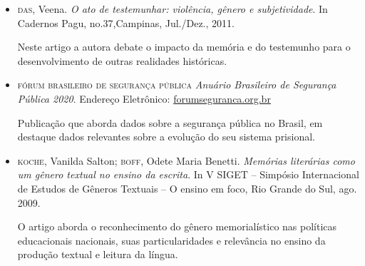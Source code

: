 \documentclass[11pt]{extarticle}
\begin{document}
\begin{itemize}



\item\textsc{das}, Veena. \textit{O ato de testemunhar: violência, gênero e subjetividade}. In
Cadernos Pagu, no.37,Campinas, Jul./Dez., 2011. 

Neste artigo a autora debate o impacto da memória e do testemunho para o desenvolvimento 
de outras realidades históricas.

\item\textsc{fórum brasileiro de
segurança pública} \textit{Anuário Brasileiro de Segurança Pública 2020}. Endereço Eletrônico:
\href{https://forumseguranca.org.br/wp-content/uploads/2020/10/anuario-14-2020-v1-interativo.pdf}{forumseguranca.org.br} 

Publicação que aborda dados sobre a segurança pública no Brasil, em
destaque dados relevantes sobre a evolução do seu sistema prisional.




\item\textsc{koche}, Vanilda Salton; \textsc{boff}, Odete Maria Benetti. \textit{Memórias literárias
como um gênero textual no ensino da escrita}. In V SIGET -- Simpósio
Internacional de Estudos de Gêneros Textuais -- O ensino em foco, Rio
Grande do Sul, ago. 2009. 

O artigo aborda o reconhecimento do gênero memorialístico nas políticas educacionais 
nacionais, suas particularidades e relevância no ensino da produção textual e leitura 
da língua.




\end{itemize}
\end{document}
